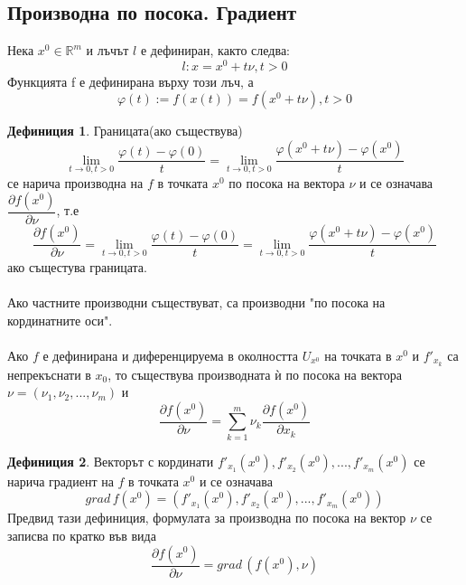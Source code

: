 \documentclass[a4paper,fleqn,12pt]{article}
\theoremstyle{definition}
\newtheorem{definition}{Дефиниция}[subsection]
\begin{document}
\subsection{Производна по посока. Градиент}
Нека $x^0 \in \mathbb{R}^m$ и лъчът $l$ е дефиниран, както следва: $$l:x = x^0 + t\nu, t > 0$$
Функцията f е дефинирана върху този лъч, а $$\varphi(t) := f(x(t)) = f(x^0 + t\nu), t > 0$$

\begin{definition}
Границата(ако съществува) 
$$\lim\limits_{t \to 0, t > 0} \dfrac{\varphi(t) - \varphi(0)}{t} = \lim\limits_{t \to 0, t > 0} \dfrac{\varphi(x^0 + t\nu) - \varphi(x^0)}{t} $$
се нарича производна на $f$ в точката $x^0$ по посока на вектора $\nu$ и се означава $\dfrac{\partial f(x^0)}{\partial \nu}$, т.е
$$\dfrac{\partial f(x^0)}{\partial \nu} = \lim\limits_{t \to 0, t > 0} \dfrac{\varphi(t) - \varphi(0)}{t} = \lim\limits_{t \to 0, t > 0} \dfrac{\varphi(x^0 + t\nu) - \varphi(x^0)}{t}$$ ако същестува границата.\\
\\
Ако частните производни съществуват, са производни "по посока на кординатните оси". \\
\\
Ако $f$ е дефинирана и диференцируема в околността $U_{x^0}$ на точката в $x^0$ и $f'_{x_k}$ са непрекъснати в $x_0$, то съществува производната ѝ по посока на вектора $\nu = (\nu_1, \nu_2, ..., \nu_m)$ и 
$$\dfrac{\partial f(x^0)}{\partial \nu} = \sum_{k = 1} ^m \nu_k \dfrac{\partial f(x^0)}{\partial x_k}$$
\end{definition}

\begin{definition}
Векторът с кординати $f'_{x_1}(x^0), f'_{x_2}(x^0), ..., f'_{x_m}(x^0)$ се нарича градиент на $f$ в точката $x^0$ и се означава 
$$grad \, f(x^0) = (f'_{x_1}(x^0), f'_{x_2}(x^0), ..., f'_{x_m}(x^0))$$
Предвид тази дефиниция, формулата за производна по посока на вектор $\nu$ се записва по кратко във вида
$$\dfrac{\partial f(x^0)}{\partial \nu} = grad \, (f(x^0), \nu)$$
\end{definition}
\end{document}
